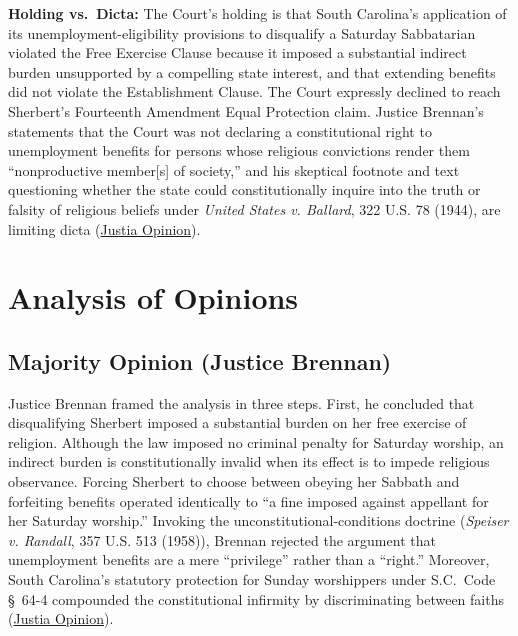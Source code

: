 \documentclass[12pt]{article}
\begin{document}
\textbf{Holding vs.\ Dicta:} The Court's holding is that South Carolina's application of its unemployment-eligibility provisions to disqualify a Saturday Sabbatarian violated the Free Exercise Clause because it imposed a substantial indirect burden unsupported by a compelling state interest, and that extending benefits did not violate the Establishment Clause. The Court expressly declined to reach Sherbert's Fourteenth Amendment Equal Protection claim. Justice Brennan's statements that the Court was not declaring a constitutional right to unemployment benefits for persons whose religious convictions render them ``nonproductive member[s] of society,'' and his skeptical footnote and text questioning whether the state could constitutionally inquire into the truth or falsity of religious beliefs under \textit{United States v. Ballard}, 322 U.S. 78 (1944), are limiting dicta (\href{https://supreme.justia.com/cases/federal/us/374/398/}{Justia Opinion}).

\section{Analysis of Opinions}

\subsection{Majority Opinion (Justice Brennan)}

Justice Brennan framed the analysis in three steps. First, he concluded that disqualifying Sherbert imposed a substantial burden on her free exercise of religion. Although the law imposed no criminal penalty for Saturday worship, an indirect burden is constitutionally invalid when its effect is to impede religious observance. Forcing Sherbert to choose between obeying her Sabbath and forfeiting benefits operated identically to ``a fine imposed against appellant for her Saturday worship.'' Invoking the unconstitutional-conditions doctrine (\textit{Speiser v. Randall}, 357 U.S. 513 (1958)), Brennan rejected the argument that unemployment benefits are a mere ``privilege'' rather than a ``right.'' Moreover, South Carolina's statutory protection for Sunday worshippers under S.C.\ Code \S~64-4 compounded the constitutional infirmity by discriminating between faiths (\href{https://supreme.justia.com/cases/federal/us/374/398/}{Justia Opinion}).
\end{document}

